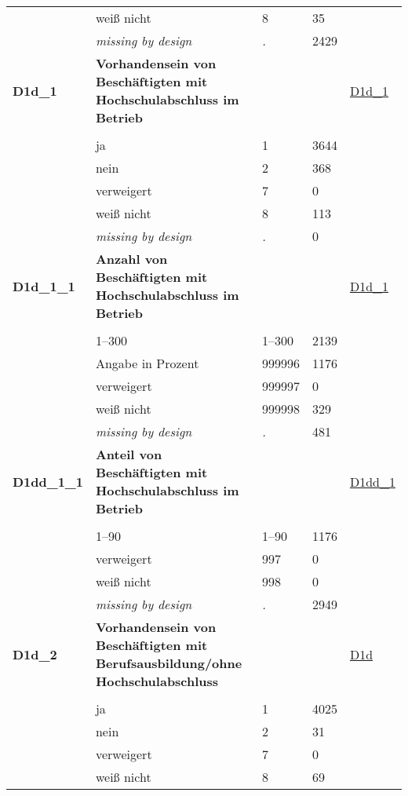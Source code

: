 \begin{longtable}{| L{2.65cm} | L{8cm} | C{1.5cm} | R{1.25cm} | C{2.25cm}  |}
   & weiß nicht & 8 & 35 &  \\ 
   & \textit{missing by design} & \textit{.} & 2429 &  \\ 
   \midrule
\textbf{D1d\_1}\label{var:D1d:1} & \textbf{Vorhandensein von Beschäftigten mit Hochschulabschluss im Betrieb} &  &  & \hyperref[D1d:1]{D1d\_1} \\ 
   &  &  &  &  \\ 
   & ja & 1 & 3644 &  \\ 
   & nein & 2 & 368 &  \\ 
   & verweigert & 7 & 0 &  \\ 
   & weiß nicht & 8 & 113 &  \\ 
   & \textit{missing by design} & \textit{.} & 0 &  \\ 
   \midrule
\textbf{D1d\_1\_1}\label{var:D1d:1:1} & \textbf{Anzahl von Beschäftigten mit Hochschulabschluss im Betrieb} &  &  & \hyperref[D1d:1]{D1d\_1} \\ 
   &  &  &  &  \\ 
   & 1--300 & 1--300 & 2139 &  \\ 
   & Angabe in Prozent & 999996 & 1176 &  \\ 
   & verweigert & 999997 & 0 &  \\ 
   & weiß nicht & 999998 & 329 &  \\ 
   & \textit{missing by design} & \textit{.} & 481 &  \\ 
   \midrule
\textbf{D1dd\_1\_1}\label{var:D1dd:1:1} & \textbf{Anteil von Beschäftigten mit Hochschulabschluss im Betrieb} &  &  & \hyperref[D1dd:1]{D1dd\_1} \\ 
   &  &  &  &  \\ 
   & 1--90 & 1--90 & 1176 &  \\ 
   & verweigert & 997 & 0 &  \\ 
   & weiß nicht & 998 & 0 &  \\ 
   & \textit{missing by design} & \textit{.} & 2949 &  \\ 
   \midrule
\textbf{D1d\_2}\label{var:D1d:2} & \textbf{Vorhandensein von Beschäftigten mit Berufsausbildung/ohne Hochschulabschluss} &  &  & \hyperref[D1d]{D1d} \\ 
   &  &  &  &  \\ 
   & ja & 1 & 4025 &  \\ 
   & nein & 2 & 31 &  \\ 
   & verweigert & 7 & 0 &  \\ 
   & weiß nicht & 8 & 69 &  \\ 

\end{longtable}
